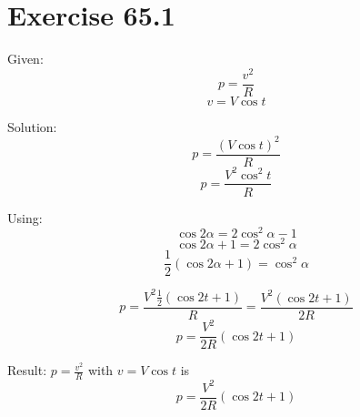 \documentclass[a4paper, 10pt]{scrartcl}
\begin{document}
\section{Exercise 65.1}

Given:
\[p = \frac{v^{2}}{R}\]
\[v = V\cos{t}\]

Solution:
\[p = \frac{(V\cos{t})^{2}}{R}\]
\[p = \frac{V^{2}\cos^{2}{t}}{R}\]

Using:
\[\cos{2\alpha} = 2\cos^{2}{\alpha} - 1\]
\[\cos{2\alpha} + 1 = 2\cos^{2}{\alpha}\]
\[\frac{1}{2}(\cos{2\alpha} + 1) = \cos^{2}{\alpha}\]

\[p = \frac{V^{2}\frac{1}{2}(\cos{2t} + 1)}{R} = \frac{V^{2}(\cos{2t} + 1)}{2R}\]
\[p = \frac{V^{2}}{2R}(\cos{2t} + 1)\]

Result:
$p = \frac{v^{2}}{R}$ with $v = V\cos{t}$ is
\[p = \frac{V^{2}}{2R}(\cos{2t} + 1)\]
\end{document}
